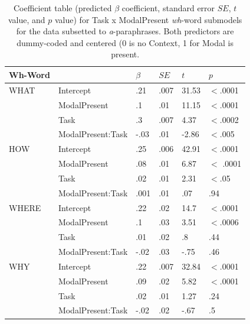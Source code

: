 \documentclass[12pt,letterpaper,table,svgnames,dvipsnames]{article}
\begin{document}
\begin{table}
\begin{center} 
\caption{Coefficient table (predicted $\beta$ coefficient, standard error $SE$, $t$ value, and $p$ value) for Task x ModalPresent \emph{wh}-word submodels for the data subsetted to \emph{a}-paraphrases. Both predictors are dummy-coded and centered (0 is no Context, 1 for Modal is present.} 
\label{sub-models_Task-a} 
\begin{tabular}{l|lllll} 
\toprule
Wh-Word & {} & $\beta$ & $SE$ & $t$ & $p$\\
\midrule
WHAT & Intercept & .21 & .007 & 31.53 & $<$.0001\\
{} & ModalPresent & .1 & .01 & 11.15 & $<$.0001\\
{} & Task & .3 & .007 & 4.37 & $<$.0002\\
{} & ModalPresent:Task & -.03 & .01 & -2.86 & $<$.005\\
\bottomrule
\toprule
HOW & Intercept & .25 & .006 & 42.91 & $<$.0001\\
{} & ModalPresent & .08 & .01 & 6.87 & $<$ .0001\\
{} & Task & .02 & .01 & 2.31 & $<$.05\\
{} & ModalPresent:Task & .001 & .01 & .07 & .94\\
\toprule
WHERE & Intercept & .22 & .02 & 14.7 & $<$.0001\\
{} & ModalPresent & .1 & .03 & 3.51 & $<$.0006\\
{} & Task & .01 & .02 & .8 & .44\\
{} & ModalPresent:Task & -.02 & .03 & -.75 & .46\\
\bottomrule
\toprule
WHY & Intercept & .22 & .007 & 32.84 & $<$.0001\\
{} & ModalPresent & .09 & .02 & 5.82 & $<$.0001\\
{} & Task & .02 & .01 & 1.27 & .24\\
{} & ModalPresent:Task & -.02 & .02 & -.67 & .5\\

\end{tabular}
\end{center}
\end{table}
\end{document}
